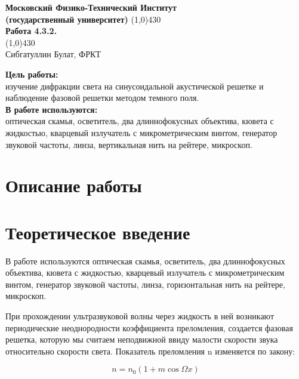 \documentclass[a4paper, 12pt]{article}%
\begin{document}
\begin{titlepage}

\begin{center}
\large\textbf{Московский Физико-Технический Институт}\\
\large\textbf{(государственный университет)}
\vfill
\line(1,0){430}\\[1mm]
\huge\textbf{Работа 4.3.2.}\\
\line(1,0){430}\\[1mm]
\vfill
\large Сибгатуллин Булат, ФРКТ\\
\end{center}

\end{titlepage}
\noindent \textbf{Цель работы:} \\
\indent изучение дифракции света на синусоидальной акустической решетке и наблюдение фазовой решетки методом темного поля.\\
\noindent \textbf{В работе используются:} \\
\indent оптическая скамья, осветитель, два длиннофокусных объектива, кювета с жидкостью, кварцевый излучатель с микрометрическим винтом, генератор звуковой частоты, линза, вертикальная нить на рейтере, микроскоп.

\section*{Описание работы}

\section*{Теоретическое введение}
	
	В работе используются оптическая скамья, осветитель, два длиннофокусных объектива, кювета с жидкостью, кварцевый излучатель с микрометрическим винтом, генератор звуковой частоты, линза, горизонтальная нить на рейтере, микроскоп. 
	
	При прохождении ультразвуковой волны через жидкость в ней возникают периодические неоднородности коэффициента преломления, создается фазовая решетка, которую мы считаем неподвижной ввиду малости скорости звука относительно скорости света. Показатель
	преломления n изменяется по закону:
	
	\begin{equation}\label{}
	n = n_0 (1 + m \cos \Omega x)
	\end{equation}
	
\end{document}
